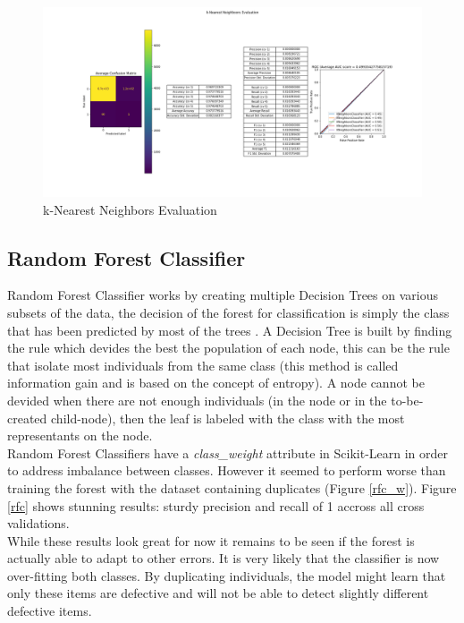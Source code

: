 \begin{figure}
    \center
    \includegraphics[scale=0.32]{img/knn_d.png}
    \caption{k-Nearest Neighbors Evaluation}
    \label{knn}
\end{figure}

\subsection{Random Forest Classifier}
Random Forest Classifier works by creating multiple Decision Trees on various subsets of the data, the decision of the forest for classification is simply the class that has been predicted by most of the trees \cite{rfc_wikipedia}. A Decision Tree is built by finding the rule which devides the best the population of each node, this can be the rule that isolate most individuals from the same class (this method is called information gain and is based on the concept of entropy)\cite{dtl_wikipedia}. A node cannot be devided when there are not enough individuals (in the node or in the to-be-created child-node), then the leaf is labeled with the class with the most representants on the node.\\

Random Forest Classifiers have a \textit{class\_weight} attribute in Scikit-Learn in order to address imbalance between classes\cite{rfc_scikit}. However it seemed to perform worse than training the forest with the dataset containing duplicates (Figure \ref{rfc_w}). Figure \ref{rfc} shows stunning results: sturdy precision and recall of 1 accross all cross validations.\\

While these results look great for now it remains to be seen if the forest is actually able to adapt to other errors. It is very likely that the classifier is now over-fitting both classes. By duplicating individuals, the model might learn that only these items are defective and will not be able to detect slightly different defective items.\\

